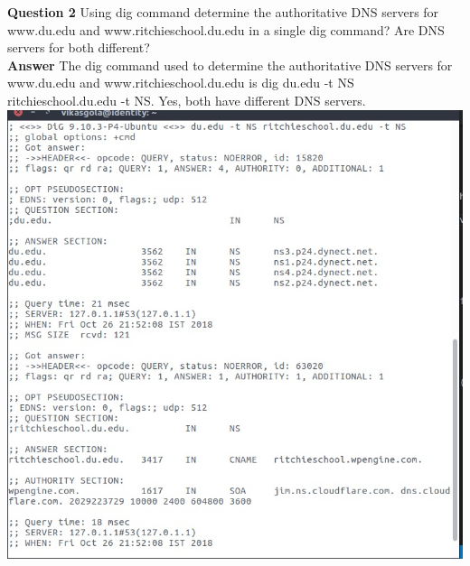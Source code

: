 \documentclass[14pt]{extarticle}
\begin{document}
    \noindent
    \textbf{\large Question 2}
    Using dig command determine the authoritative DNS servers for www.du.edu and www.ritchieschool.du.edu in a single dig command? Are DNS servers for both different?\\[10pt]
    \textbf{\large Answer}
    The dig command used to determine the authoritative DNS servers for www.du.edu and www.ritchieschool.du.edu is \textsf{ dig du.edu -t NS ritchieschool.du.edu -t NS}.
    Yes, both have different DNS servers.\\[10pt]
    \includegraphics[scale=0.65]{4_2}
    \vspace{1cm}
\end{document}
